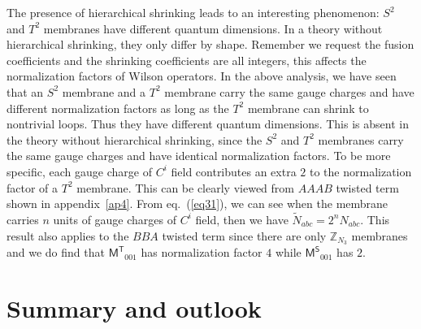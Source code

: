 \documentclass[11pt,nofootinbib,preprint]{revtex4-1}
\begin{document}
The presence of hierarchical shrinking leads to an interesting phenomenon: $S^2$ and $T^2$ membranes have different quantum dimensions. In a theory without hierarchical shrinking, they only differ by shape. Remember we request the fusion coefficients and the shrinking coefficients are all integers, this affects the normalization factors of Wilson operators. In the above analysis, we have seen that an $S^2$ membrane and a $T^2$ membrane carry the same gauge charges and have different normalization factors as long as the $T^2$ membrane can shrink to nontrivial loops. Thus they have different quantum dimensions. This is absent in the theory without hierarchical shrinking, since the $S^2$ and $T^2$ membranes carry the same gauge charges and have identical normalization factors. To be more specific, each gauge charge of $C^i$ field contributes an extra $2$ to the normalization factor of a $T^2$ membrane. This can be clearly viewed from $AAAB$ twisted term shown in appendix~\ref{ap4}. From eq.~(\ref{eq31}), we can see when the membrane carries $n$ units of gauge charges of $C^i$ field, then we have $\tilde{N}_{abc}=2^nN_{abc}$. This result also applies to the $BBA$ twisted term since there are only $\mathbb{Z}_{N_3}$ membranes and we do find that $\mathsf{M^T}_{001}$ has normalization factor $4$ while $\mathsf{M^S}_{001}$ has $2$. 



\section{Summary and outlook}\label{section_summary}
\end{document}
